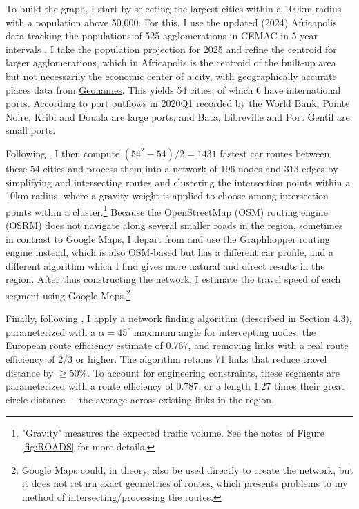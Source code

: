 \documentclass[a4paper]{article}
\begin{document}
To build the graph, I start by selecting the largest cities within a 100km radius with a population above 50,000. For this, I use the updated (2024) Africapolis data tracking the populations of 525 agglomerations in CEMAC in 5-year intervals \citep{africapolis2024}. I take the population projection for 2025 and refine the centroid for larger agglomerations, which in Africapolis is the centroid of the built-up area but not necessarily the economic center of a city, with geographically accurate places data from \href{https://public.opendatasoft.com/explore/dataset/geonames-all-cities-with-a-population-500/table/?disjunctive.country}{Geonames}. This yields 54 cities, of which 6 have international ports. According to port outflows in 2020Q1 recorded by the \href{https://datacatalog.worldbank.org/search/dataset/0038118/Global---International-Ports}{World Bank}, Pointe Noire, Kribi and Douala are large ports, and Bata, Libreville and Port Gentil are small ports. \newline 

Following \citet{krantz2024optimal}, I then compute $(54^2-54)/2 = 1431$ fastest car routes between these 54 cities and process them into a network of 196 nodes and 313 edges by simplifying and intersecting routes and clustering the intersection points within a 10km radius, where a gravity weight is applied to choose among intersection points within a cluster.\footnote{"Gravity" measures the expected traffic volume. See the notes of Figure \ref{fig:ROADS} for more details.} Because the OpenStreetMap (OSM) routing engine (OSRM) does not navigate along several smaller roads in the region, sometimes in contrast to Google Maps, I depart from \citet{krantz2024optimal} and use the Graphhopper routing engine instead, which is also OSM-based but has a different car profile, and a different algorithm which I find gives more natural and direct results in the region. After thus constructing the network, I estimate the travel speed of each segment using Google Maps.\footnote{Google Maps could, in theory, also be used directly to create the network, but it does not return exact geometries of routes, which presents problems to my method of intersecting/processing the routes. \vspace{-4mm}}   \newline 

Finally, following \citet{krantz2024optimal}, I apply a network finding algorithm (described in \citet{krantz2024optimal} Section 4.3), parameterized with a $\alpha = 45^\circ$ maximum angle for intercepting nodes, the European route efficiency estimate of 0.767, and removing links with a real route efficiency of 2/3 or higher. The algorithm retains 71 links that reduce travel distance by $\geq$50\%. To account for engineering constraints, these segments are parameterized with a route efficiency of 0.787, or a length 1.27 times their great circle distance $-$ the average across existing links in the region.  \newline
\end{document}
